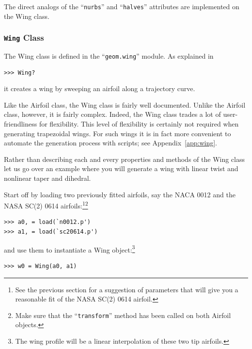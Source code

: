 \documentclass[]{article}
\begin{document}
The direct analogs of the ``\texttt{nurbs}'' and ``\texttt{halves}'' 
attributes are implemented on the Wing class.

\subsubsection{\texttt{Wing} Class}
\label{subsubsec:wing}

The Wing class is defined in the ``\texttt{geom.wing}'' module.  As 
explained in
\begin{verbatim}
>>> Wing?
\end{verbatim}
it creates a wing by sweeping an airfoil along a trajectory curve.

Like the Airfoil class, the Wing class is fairly well documented.  
Unlike the Airfoil class, however, it is fairly complex.  Indeed, the 
Wing class trades a lot of user-friendliness for flexibility.  This 
level of flexibility is certainly not required when generating 
trapezoidal wings.  For such wings it is in fact more convenient to 
automate the generation process with scripts; see 
Appendix~\ref{app:wing}.

Rather than describing each and every properties and methods of the Wing 
class let us go over an example where you will generate a wing with 
linear twist and nonlinear taper and dihedral.

Start off by loading two previously fitted airfoils, say the NACA 0012 
and the NASA SC(2) 0614 airfoils:\footnote{See the previous section for 
a suggestion of parameters that will give you a reasonable fit of the 
NASA SC(2) 0614 airfoil.}\footnote{Make sure that the 
``\texttt{transform}'' method has been called on both Airfoil objects.}
\begin{verbatim}
>>> a0, = load(`n0012.p')
>>> a1, = load(`sc20614.p')
\end{verbatim}
and use them to instantiate a Wing object:\footnote{The wing profile 
will be a linear interpolation of these two tip airfoils.}
\begin{verbatim}
>>> w0 = Wing(a0, a1)
\end{verbatim}
\end{document}

